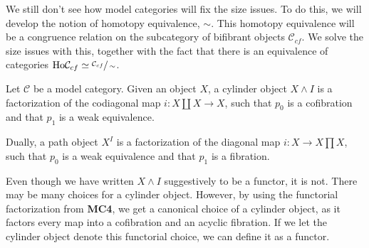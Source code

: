 \documentclass[../thesis.tex]{subfiles}
\begin{document}
            We still don't see how model categories will fix the size issues. To do this, we will develop the notion of homotopy equivalence, $\sim$. This homotopy equivalence will be a congruence relation on the subcategory of bifibrant objects $\mathcal{C}_{cf}$. We solve the size issues with this, together with the fact that there is an equivalence of categories $\text{Ho}\mathcal{C}_{cf}\simeq \sfrac{\mathcal{C}_{cf}}{\sim}$.

            \begin{definition}
                Let $\mathcal{C}$ be a model category. Given an object $X$, a cylinder object $X\wedge I$ is a factorization of the codiagonal map $i: X\coprod X \rightarrow X$, such that $p_0$ is a cofibration and that $p_1$ is a weak equivalence. 
                
                \begin{center}
                \end{center}

                Dually, a path object  $X^{I}$ is a factorization of the diagonal map $i: X \rightarrow X\prod X$, such that $p_0$ is a weak equivalence and that $p_1$ is a fibration.
                
                \begin{center}
                \end{center}
            \end{definition}

            \begin{remark}
                Even though we have written $X\wedge I$ suggestively to be a functor, it is not. There may be many choices for a cylinder object. However, by using the functorial factorization from \textbf{MC4}, we get a canonical choice of a cylinder object, as it factors every map into a cofibration and an acyclic fibration. If we let the cylinder object denote this functorial choice, we can define it as a functor.
            \end{remark}
\end{document}
